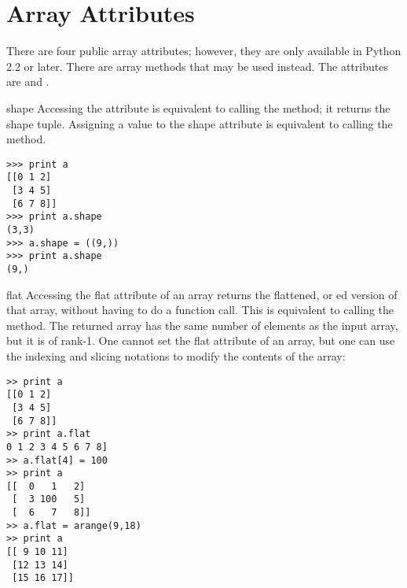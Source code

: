 \chapter{Array Attributes}
\label{cha:array-attributes}

There are four public array attributes; however, they are only available 
in Python 2.2 or later. There are array methods that may be used instead. The
attributes are  and .


\begin{memberdesc}[numarray]{shape}
   Accessing the  attribute is equivalent to calling the
    method; it returns the shape tuple.  Assigning a value to
   the shape attribute is equivalent to calling the  method.
\begin{verbatim}
>>> print a
[[0 1 2]
 [3 4 5]
 [6 7 8]]
>>> print a.shape
(3,3)
>>> a.shape = ((9,))
>>> print a.shape
(9,)
\end{verbatim}
\end{memberdesc}


\begin{memberdesc}[numarray]{flat}
   \label{mem:numarray:flat}
   Accessing the flat attribute of an array returns the flattened, or
   ed version of that array, without having to do a function
   call.  This is equivalent to calling the  method. The
   returned array has the same number of elements as the input array, but it is
   of rank-1. One cannot set the flat attribute of an array, but one can use
   the indexing and slicing notations to modify the contents of the array:
\begin{verbatim}
>> print a
[[0 1 2]
 [3 4 5]
 [6 7 8]]
>> print a.flat
0 1 2 3 4 5 6 7 8]
>> a.flat[4] = 100
>> print a
[[  0   1   2]
 [  3 100   5]
 [  6   7   8]]
>> a.flat = arange(9,18)
>> print a
[[ 9 10 11]
 [12 13 14]
 [15 16 17]]
\end{verbatim}
\end{memberdesc}


